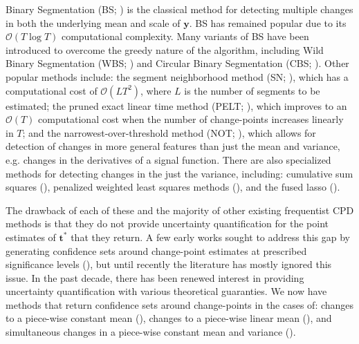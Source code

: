 Binary Segmentation (BS; \citealp{Scott74, Sen75, Vostrikova81}) is the classical method for detecting multiple changes in both the underlying mean and scale of $\mathbf{y}$. BS has remained popular due to its $\mathcal{O}(T\log T)$ computational complexity. Many variants of BS have been introduced to overcome the greedy nature of the algorithm, including Wild Binary Segmentation (WBS; \citealp{Fryzlewicz14}) and Circular Binary Segmentation (CBS; \citealp{Olshen04}). Other popular methods include: the segment neighborhood method (SN; \citealp{Auger89}), which has a computational cost of $\mathcal{O}(LT^2)$, where $L$ is the number of segments to be estimated; the pruned exact linear time method (PELT; \citealp{Killick12}), which improves to an $\mathcal{O}(T)$ computational cost when the number of change-points increases linearly in $T$; and the narrowest-over-threshold method (NOT; \citealp{Baranowski19}), which allows for detection of changes in more general features than just the mean and variance, e.g. changes in the derivatives of a signal function. There are also specialized methods for detecting changes in the just the variance, including: cumulative sum squares (\citealp{Inclan94}), penalized weighted least squares methods (\citealp{Chen97, Gao19}), and the fused lasso (\citealp{Padilla22}). 

The drawback of each of these and the majority of other existing frequentist CPD methods is that they do not provide uncertainty quantification for the point estimates of $\mathbf{t}^*$ that they return. A few early works sought to address this gap by generating confidence sets around change-point estimates at prescribed significance levels (\citealp{Worsley86, Siegmund86, Bai03}), but until recently the literature has mostly ignored this issue. In the past decade, there has been renewed interest in providing uncertainty quantification with various theoretical guaranties. We now have methods that return confidence sets around change-points in the cases of: changes to a piece-wise constant mean (\citealp{Frick14, Fang20, Jewell22}), changes to a piece-wise linear mean (\citealp{Fryzlewicz23}), and simultaneous changes in a piece-wise constant mean and variance (\citealp{Bai10, Pein17, Eichinger18}). 

